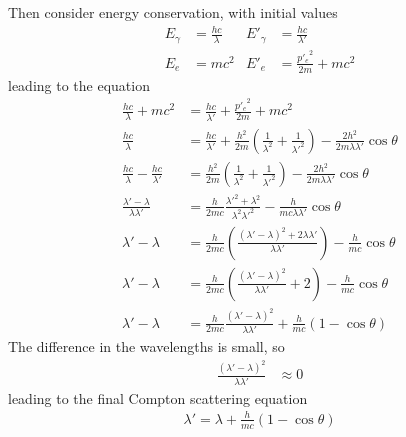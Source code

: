 Then consider energy conservation, with initial values
\begin{align*}
	E_\gamma  &= \frac{hc}{{\lambda}}			&		E'_\gamma  &= \frac{hc}{{\lambda}'} \\
	E_e &= mc^2					&		E'_e &= \frac{{p'_e}^2}{2m} + mc^2
\end{align*}
leading to the equation
\begin{align*}
	\frac{hc}{{\lambda}} + mc^2 &= \frac{hc}{{\lambda}'} + \frac{{p'_e}^2}{2m} + mc^2
	\\
	\frac{hc}{{\lambda}} &= \frac{hc}{{\lambda}'} + \frac{h^2}{2m} \left( \frac{1}{{\lambda}^2} +
		\frac{1}{{\lambda}'^2} \right) - \frac{2h^2}{2m{\lambda}{\lambda}'}\cos \theta 
	\\
	\frac{hc}{{\lambda}} - \frac{hc}{{\lambda}'} &= \frac{h^2}{2m} \left( \frac{1}{{\lambda}^2} +
		\frac{1}{{\lambda}'^2} \right) - \frac{2h^2}{2m{\lambda}{\lambda}'}\cos \theta 
	\\
	\frac{{\lambda}' - {\lambda}}{{\lambda}{\lambda}'} &= \frac{h}{2mc} \frac{{\lambda}'^2 + {\lambda}^2}{{\lambda}^2{{\lambda}'}^2} -
		\frac{h}{mc{\lambda}{\lambda}'}\cos \theta 
	\\
	{\lambda}' - {\lambda} &= \frac{h}{2mc} \left( \frac{({\lambda}' - {\lambda})^2 + 2{\lambda}{\lambda}'}{{\lambda}{\lambda}'} \right) -
		\frac{h}{mc}\cos \theta 
	\\
	{\lambda}' - {\lambda} &= \frac{h}{2mc} \left( \frac{({\lambda}' - {\lambda})^2}{{\lambda}{\lambda}'} + 2 \right) -
		\frac{h}{mc}\cos \theta 
	\\
	{\lambda}' - {\lambda} &= \frac{h}{2mc} \frac{({\lambda}' - {\lambda})^2}{{\lambda}{\lambda}'} + \frac{h}{mc}(1 - \cos \theta )
\end{align*}
The difference in the wavelengths is small, so
\begin{align*}
	\frac{({\lambda}' - {\lambda})^2}{{\lambda}{\lambda}'} &\approx 0
\end{align*}
leading to the final Compton scattering equation
\begin{align}
	\boxed{
	{\lambda}' = {\lambda} + \frac{h}{mc}(1 - \cos \theta )
	}
\end{align}

